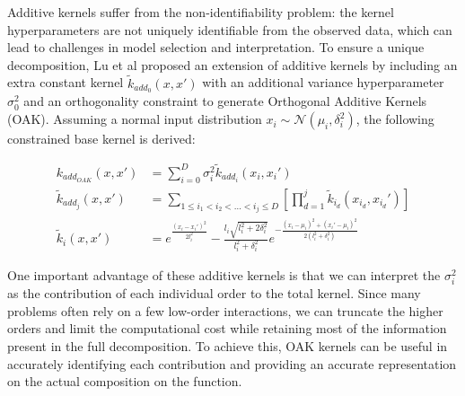 \documentclass{IOS-Book-Article}
\begin{document}
		
	Additive kernels suffer from the non-identifiability problem: the kernel hyperparameters are not uniquely identifiable from the observed data, which can lead to challenges in model selection and interpretation.
	To ensure a unique decomposition, Lu et al\cite{gp-additive-orthogonal} proposed an extension of additive kernels by including an extra constant kernel $\tilde{k}_{add_0}(x,x')$ with an additional variance hyperparameter $\sigma_0^2$ and an orthogonality constraint to generate Orthogonal Additive Kernels (OAK)\cite{gp-additive-orthogonal}. Assuming a normal input distribution $x_i \sim \mathcal{N}(\mu_i, \delta_i^2)$, the following constrained base kernel is derived:
	
	\begin{equation} \label{eq:additive-orthogonal}
		\begin{aligned}
			k_{add_{OAK}}(x,x') &= \sum_{i=0}^D{\sigma_i^2  \tilde{k}_{add_i}(x_i,x_i')} \\
			\tilde{k}_{add_j}(x,x') &= \sum_{1\leq i_1 < i_2 < \ldots < i_j\leq D} \left[\prod_{d=1}^{j} \tilde{k}_{i_d}(x_{i_d},x_{i_d}') \right]\\		
			\tilde{k}_i(x,x') &= e^{\frac{(x_i-x_i')^2}{2l_i^2}} - \frac{l_i\sqrt{l_i^2 + 2\delta_i^2}}{l_i^2 + \delta_i^2} e^{-\frac{(x_i-\mu_i)^2 + (x_i'-\mu_i)^2}{2(l_i^2 + \delta_i^2)}}
		\end{aligned}
	\end{equation}
	
	One important advantage of these additive kernels is that we can interpret the $\sigma_i^2$ as the contribution of each individual order to the total kernel. Since many problems often rely on a few low-order interactions, we can truncate the higher orders and limit the computational cost while retaining most of the information present in the full decomposition. To achieve this, OAK kernels can be useful in accurately identifying each contribution and providing an accurate representation on the actual composition on the function.
	
\end{document}
